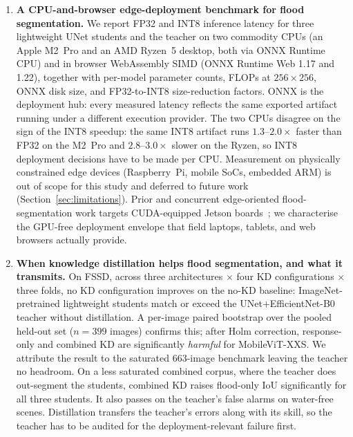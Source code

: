 \begin{enumerate}
\item \textbf{A CPU-and-browser edge-deployment benchmark for flood segmentation.} We report FP32 and INT8 inference latency for three lightweight UNet students and the teacher on two commodity CPUs (an Apple M2~Pro and an AMD Ryzen~5 desktop, both via ONNX Runtime CPU) and in browser WebAssembly SIMD (ONNX Runtime Web 1.17 and 1.22), together with per-model parameter counts, FLOPs at $256{\times}256$, ONNX disk size, and FP32-to-INT8 size-reduction factors. ONNX is the deployment hub: every measured latency reflects the same exported artifact running under a different execution provider. The two CPUs disagree on the sign of the INT8 speedup: the same INT8 artifact runs $1.3$--$2.0\times$ faster than FP32 on the M2~Pro and $2.8$--$3.0\times$ slower on the Ryzen, so INT8 deployment decisions have to be made per CPU. Measurement on physically constrained edge devices (Raspberry~Pi, mobile SoCs, embedded ARM) is out of scope for this study and deferred to future work (Section~\ref{sec:limitations}). Prior and concurrent edge-oriented flood-segmentation work targets CUDA-equipped Jetson boards~\cite{hernandez2022flood,schmalstieg2026distillation}; we characterise the GPU-free deployment envelope that field laptops, tablets, and web browsers actually provide.

\item \textbf{When knowledge distillation helps flood segmentation, and what it transmits.} On FSSD, across three architectures $\times$ four KD configurations $\times$ three folds, no KD configuration improves on the no-KD baseline: ImageNet-pretrained lightweight students match or exceed the UNet$+$EfficientNet-B0 teacher without distillation. A per-image paired bootstrap over the pooled held-out set ($n=399$ images) confirms this; after Holm correction, response-only and combined KD are significantly \emph{harmful} for MobileViT-XXS. We attribute the result to the saturated 663-image benchmark leaving the teacher no headroom. On a less saturated combined corpus, where the teacher does out-segment the students, combined KD raises flood-only IoU significantly for all three students. It also passes on the teacher's false alarms on water-free scenes. Distillation transfers the teacher's errors along with its skill, so the teacher has to be audited for the deployment-relevant failure first.


\end{enumerate}
